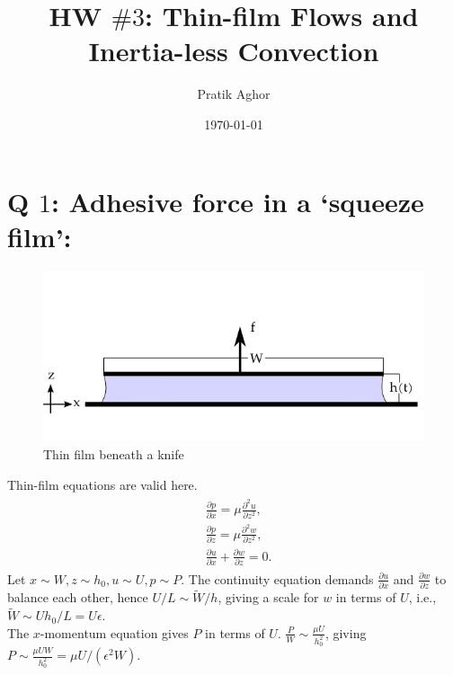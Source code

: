 \documentclass{article}
\author{Pratik Aghor}
\title{HW $\# 3$: Thin-film Flows and Inertia-less Convection}
\date{\today}  %
\begin{document}
\maketitle
\section{Q $1$: Adhesive force in a ‘squeeze film’:}
\begin{figure}[H]
    \centering
    \includegraphics[scale = 0.5]{Figs/thin_film_knife.png}
    \caption{Thin film beneath a knife}
    \label{fig:thin_film_knife}
\end{figure}

Thin-film equations are valid here.
\begin{align}\label{eq:thin_film_dim}
 \begin{split}
  & \frac{\partial p}{\partial x} = \mu\frac{\partial^{2}u}{\partial z^{2}},\\
  & \frac{\partial p}{\partial z} = \mu\frac{\partial^{2}w}{\partial z^{2}},\\
  & \frac{\partial u}{\partial x} + \frac{\partial w}{\partial z} = 0.
 \end{split}
\end{align}
Let $x\sim W, z \sim h_{0}, u \sim U, p \sim P$. The continuity equation demands $\frac{\partial u}{\partial x}$ and $\frac{\partial w}{\partial z}$ to balance each other, hence $U/L \sim \tilde{W}/h$, giving a scale for $w$ in terms of $U$, i.e., $\tilde{W} \sim Uh_{0}/L = U\epsilon$.\\
The $x$-momentum equation gives $P$ in terms of $U$. 
$\frac{P}{W} \sim \frac{\mu U}{h_{0}^{2}}$, giving $P \sim \frac{\mu U W}{h_{0}^{2}} = \mu U/(\epsilon^{2}W)$.
\end{document}
